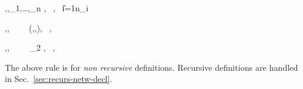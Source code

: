 {\TE,\EE,\NE \vdash \tm{(}_1,\ldots,_n\tm{)} \gives {},~ ,~ \U{i=1}{n}{\WW_i}}

\infrule[NFun]
{}
{\TE,\EE,\NE \vdash {}~~\tm{\rightarrow}~~\gives
  (,,\NE),~ \emptyenv,~ \emptyenv}

{\TE,\EE,\NE \vdash {}~ ~ ~ _2 \gives \rho,~ \BB,~ \WW}

The above rule is for \emph{non recursive} definitions. Recursive definitions are handled
in Sec.~\ref{sec:recurs-netw-decl}.








